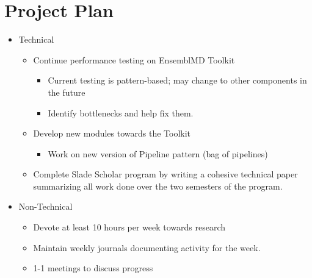 \documentclass{article}
\begin{document}
\section*{Project Plan}
\begin{itemize}
	\item Technical
	\begin{itemize}
		\item Continue performance testing on EnsemblMD Toolkit
		\begin{itemize}
			\item Current testing is pattern-based; may change to other components in the future
			\item Identify bottlenecks and help fix them.
		\end{itemize}
		\item Develop new modules towards the Toolkit
		\begin{itemize}
			\item Work on new version of Pipeline pattern (bag of pipelines)
		\end{itemize}
		\item Complete Slade Scholar program by writing a cohesive technical paper summarizing all work done over the two semesters of the program.
	\end{itemize}
	\item Non-Technical
	\begin{itemize}
		\item Devote at least 10 hours per week towards research
		\item Maintain weekly journals documenting activity for the week.
		\item 1-1 meetings to discuss progress
	\end{itemize}
\end{itemize}
\end{document}
